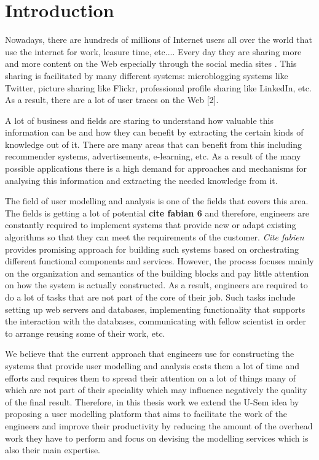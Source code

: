 
\chapter{\label{cha:intro}Introduction}

Nowadays, there are hundreds of millions of Internet users all over the world that use the internet for work, leasure time, etc.... Every day they are sharing more and more content on the Web especially through the social media sites \cite{On social Web sites}. This sharing is facilitated by many different systems: microblogging systems like Twitter, picture sharing like Flickr, professional profile sharing like LinkedIn, etc. As a result, there are a lot of user traces on the Web [2].

A lot of business and fields are staring to understand how valuable this information can be and how they can benefit by extracting the certain kinds of knowledge out of it. There are many areas that can benefit from this including recommender systems, advertisements, e-learning, etc. As a result of the many possible applications there is a high demand for approaches and mechanisms for analysing this information and extracting the needed knowledge from it. 

The field of user modelling and analysis is one of the fields that covers this area. The fields is getting a lot of potential \textbf{cite fabian 6} and therefore, engineers are constantly required to implement systems that provide new or adapt existing algorithms so that they can meet the requirements of the customer. \textit{Cite fabien} provides promising approach for building such systems based on orchestrating different functional components and services. However, the process focuses mainly on the organization and semantics of the building blocks and pay little attention on how the system is actually constructed. As a result, engineers are required to do a lot of tasks that are not part of the core of their job. Such tasks include setting up web servers and databases, implementing functionality that supports the interaction with the databases, communicating with fellow scientist in order to arrange reusing some of their work, etc. 

We believe that the current approach that engineers use for constructing the systems that provide user modelling and analysis  costs them a lot of time and efforts and requires them to spread their attention on a lot of things many of which are not part of their speciality which may influence negatively the quality of the final result. Therefore, in this thesis work we extend the U-Sem idea by proposing a user modelling platform that aims to facilitate the work of the engineers and improve their productivity by reducing the amount of the overhead work they have to perform and focus on devising the modelling services which is also their main expertise.


